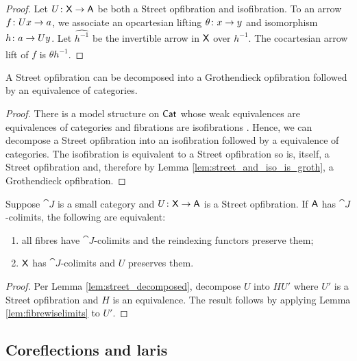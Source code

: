 \documentclass{amsart}
\begin{document}
\begin{proof}
  Let $U \colon\mathsf{X} \to \mathsf{A}$ be both a Street opfibration and isofibration. To an arrow $f \colon Ux \to a$, we associate an opcartesian lifting $\theta \colon x \to y$ and isomorphism $h \colon a \to Uy$. Let $\hat{h^{-1}}$ be the invertible arrow in $\mathsf{X}$ over $h^{-1}$. The cocartesian arrow lift of $f$ is $\theta \hat{h^{-1}}$.  
\end{proof}

\begin{lem} \label{lem:street_decomposed}
  A Street opfibration can be decomposed into a Grothendieck opfibration followed by an equivalence of categories.
\end{lem}

\begin{proof}
  There is a model structure on $\mathsf{Cat}$ whose weak equivalences are equivalences of categories and fibrations are isofibrations \cite{rezk}. Hence, we can decompose a Street opfibration into an isofibration followed by a equivalence of categories. The isofibration is equivalent to a Street opfibration so is, itself, a Street opfibration and, therefore by Lemma \ref{lem:street_and_iso_is_groth}, a Grothendieck opfibration.  
\end{proof}

\begin{lem} \label{lem:street-fibrewise-limits}
  Suppose $ \cat{J} $ is a small category and $ U \colon \mathsf{X}
  \to \mathsf{A} $ is a Street opfibration. If $ \mathsf{A} $ has $ \cat{J}
  $-colimits, the following are equivalent:
  \begin{enumerate}
  \item
    all fibres have $ \cat{J} $-colimits and the
    reindexing functors preserve them;
  \item
    $ \mathsf{X} $ has $ \cat{J} $-colimits and $ U $ preserves
    them.
  \end{enumerate}
\end{lem}

\begin{proof}
  Per Lemma \ref{lem:street_decomposed}, decompose $U$ into $H U'$ where $U'$ is a Street opfibration and $H$ is an equivalence. The result follows by applying Lemma \ref{lem:fibrewiselimits} to $U'$.  
\end{proof}

\subsection*{Coreflections and laris}
\end{document}
